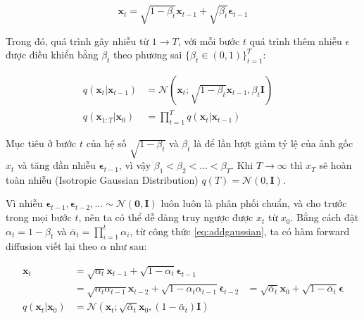\begin{equation}
	\label{eq:addgaussian}
	\mathbf{x}_t = \sqrt{1 - \beta_t}\mathbf{x}_{t-1} + \sqrt{\beta_t} \boldsymbol{\epsilon}_{t-1}
\end{equation}

Trong đó, quá trình gây nhiễu từ $1 \to T$, với mỗi bước $t$ quá trình thêm nhiễu $\epsilon$ được điều khiển bằng $\beta_t$ theo phương sai $\{\beta_t \in (0, 1)\}_{t=1}^T$:

\begin{equation}
	\label{eq:forward_diffusion_process}
	\begin{aligned}
		q(\mathbf{x}_t \vert \mathbf{x}_{t-1}) &= \mathcal{N}(\mathbf{x}_t; \sqrt{1 - \beta_t} \mathbf{x}_{t-1}, \beta_t\mathbf{I}) \quad \\
		q(\mathbf{x}_{1:T} \vert \mathbf{x}_0) &= \prod^T_{t=1} q(\mathbf{x}_t \vert \mathbf{x}_{t-1})
	\end{aligned}
\end{equation}

Mục tiêu ở bước $t$ của hệ số $\sqrt{1 - \beta_t}$ và $\beta_t$ là để lần lượt giảm tỷ lệ của ảnh gốc $x_t$ và tăng dần nhiễu  $\boldsymbol{\epsilon}_{t-1}$, vì vậy $\beta_1 < \beta_2 < \dots < \beta_T$. Khi $T \to \infty$ thì $x_{T}$ sẽ hoàn toàn nhiễu (Isotropic Gaussian Distribution) $q(T) = \mathcal{N} (0, \mathbf{I})$.


Vì nhiễu $\boldsymbol{\epsilon}_{t-1}, \boldsymbol{\epsilon}_{t-2}, \dots \sim \mathcal{N}(\mathbf{0}, \mathbf{I})$ luôn luôn là phân phối chuẩn, và cho trước trong mọi bước $t$, nên ta có thể dễ dàng truy ngược được $x_t$ từ $x_0$. Bằng cách đặt $\alpha_t = 1 - \beta_t$ và $\bar{\alpha}_t = \prod_{i=1}^t \alpha_i$, từ công thức \ref{eq:addgaussian}, ta có hàm forward diffusion viết lại theo $\alpha$ như sau:

\begin{equation}
	\label{eq:tracexzero}
	\begin{aligned}
		\mathbf{x}_t 
		&= \sqrt{\alpha_t}\mathbf{x}_{t-1} + \sqrt{1 - \alpha_t}\boldsymbol{\epsilon}_{t-1} \\
		&= \sqrt{\alpha_t \alpha_{t-1}} \mathbf{x}_{t-2} + \sqrt{1 - \alpha_t \alpha_{t-1}} \bar{\boldsymbol{\epsilon}}_{t-2}
		&= \sqrt{\bar{\alpha}_t}\mathbf{x}_0 + \sqrt{1 - \bar{\alpha}_t}\boldsymbol{\epsilon} \\
		q(\mathbf{x}_t \vert \mathbf{x}_0) &= \mathcal{N}(\mathbf{x}_t; \sqrt{\bar{\alpha}_t} \mathbf{x}_0, (1 - \bar{\alpha}_t)\mathbf{I})
	\end{aligned}
\end{equation}


